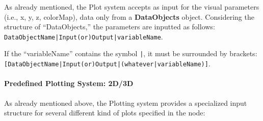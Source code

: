 As already mentioned, the Plot system accepts as input for the visual parameters
(i.e., x, y, z, colorMap), data only from a \textbf{DataObjects} object.
%
Considering the structure of ``DataObjects,'' the parameters are inputted as follows:
\texttt{DataObjectName|Input(or)Output|variableName}.

If the ``variableName'' contains the symbol \texttt{|}, it must be surrounded by
brackets:
\texttt{[DataObjectName|Input(or)Output|(whatever|variableName)]}.
\paragraph{Predefined Plotting System: 2D/3D \label{sec:23Dplotting}}
As already mentioned above, the Plotting system provides a specialized input
structure for several different kind of plots specified in the 
node:
